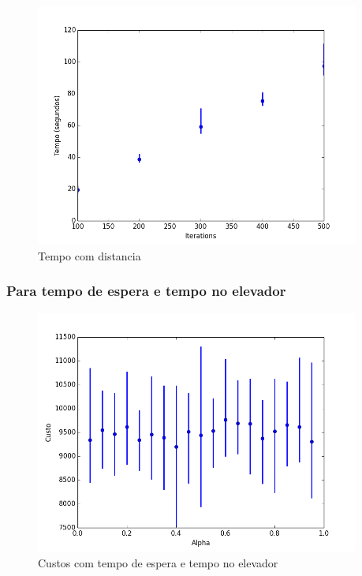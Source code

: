 		\begin{figure}[H]
			\centering
			\includegraphics[height=8cm]{images/time_both_iterations}
			\caption{Tempo com distancia}
			\label{fig:timedistanceiterations}
		\end{figure}
	
	\subsubsection{Para tempo de espera e tempo no elevador} %
		\begin{figure}[H]
			\centering
			\includegraphics[height=8cm]{images/cost_both_alpha} %
			\caption{Custos com tempo de espera e tempo no elevador}
			\label{fig:costwaitingiterations}
		\end{figure}
		
